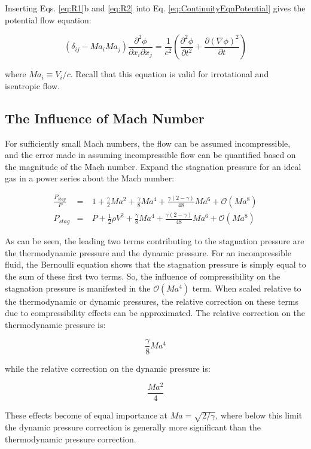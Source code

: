 \documentclass[10pt]{article}
\newcommand{\beq}{\begin{equation}}
\newcommand{\eeq}{\end{equation}}
\begin{document}
\begin{flushleft}
Inserting Eqs. \eqref{eq:R1}b and \eqref{eq:R2} into Eq. \eqref{eq:ContinuityEqnPotential} gives the potential flow equation:

\beq
\label{eq:PotentialFlowModel}
\left(\delta_{ij}-Ma_iMa_j\right)\frac{\partial^2\phi}{\partial x_i\partial x_j}=\frac{1}{c^2}\left(\frac{\partial^2\phi}{\partial t^2}+\frac{\partial(\nabla\phi)^2}{\partial t}\right)
\eeq

where \(Ma_i\equiv V_i/c\). Recall that this equation is valid for irrotational and isentropic flow.

\subsection{The Influence of Mach Number}
For sufficiently small Mach numbers, the flow can be assumed incompressible, and the error made in assuming incompressible flow can be quantified based on the magnitude of the Mach number. Expand the stagnation pressure for an ideal gas in a power series about the Mach number:

\begin{subequations}
\label{eq:MachExpansion}
\begin{eqnarray}
\frac{P_{stag}}{P}&=&\ 1+\frac{\gamma}{2}Ma^2+\frac{\gamma}{8}Ma^4+\frac{\gamma(2-\gamma)}{48}Ma^6+\mathscr{O}(Ma^8)\\
P_{stag}&=&\ P+\frac{1}{2}\rho V^2+\frac{\gamma}{8}Ma^4+\frac{\gamma(2-\gamma)}{48}Ma^6+\mathscr{O}(Ma^8)
\end{eqnarray}
\end{subequations}

As can be seen, the leading two terms contributing to the stagnation pressure are the thermodynamic pressure and the dynamic pressure. For an incompressible fluid, the Bernoulli equation shows that the stagnation pressure is simply equal to the sum of these first two terms. So, the influence of compressibility on the stagnation pressure is manifested in the \(\mathscr{O}(Ma^4)\) term. When scaled relative to the thermodynamic or dynamic pressures, the relative correction on these terms due to compressibility effects can be approximated. The relative correction on the thermodynamic pressure is:

\beq
\label{eq:PTCorrection}
\frac{\gamma}{8}Ma^4
\eeq

while the relative correction on the dynamic pressure is:

\beq
\label{eq:PDCorrection}
\frac{Ma^2}{4}
\eeq

These effects become of equal importance at \(Ma=\sqrt{2/\gamma}\), where below this limit the dynamic pressure correction is generally more significant than the thermodynamic pressure correction.


\end{flushleft}
\end{document}
